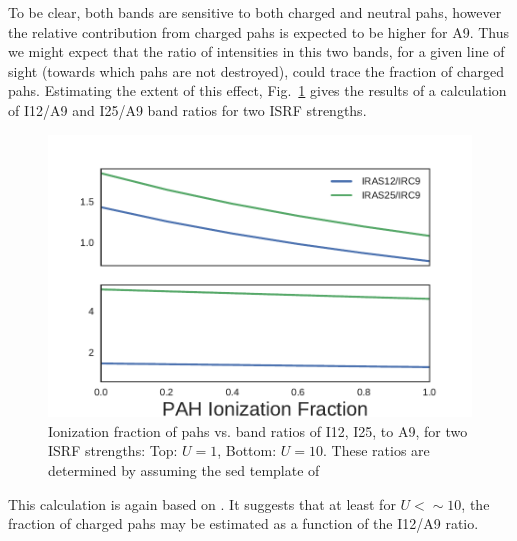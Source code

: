         To be clear, both bands are sensitive to both charged and neutral \acrshort{pah}s, however the relative contribution from charged \acrshort{pah}s is expected to be higher for A9. Thus we might expect that the ratio of intensities in this two bands, for a given line of sight (towards which \acrshort{pah}s are not destroyed), could trace the fraction of charged \acrshort{pah}s. Estimating the extent of this effect, Fig.~\ref{fig:band-ratio-multiple} gives the results of a calculation of I12/A9 and I25/A9 band ratios for two ISRF strengths.
          \begin{figure}
              \centering
              \includegraphics[width=\textwidth]{../Plots/ch_datasources/band-ratio-multiple.pdf}
              \caption{Ionization fraction of \acrshort{pah}s vs. band ratios of I12, I25, to A9, for two ISRF strengths: Top: $U = 1$, Bottom: $U = 10$. These ratios are determined by assuming the \acrshort{sed} template of \cite{dustem11} }
              \label{fig:band-ratio-multiple}
          \end{figure}
        This calculation is again based on \cite{dustem11}. It suggests that at least for $U<\sim{}10$, the fraction of charged \acrshort{pah}s may be estimated as a function of the I12/A9 ratio.

